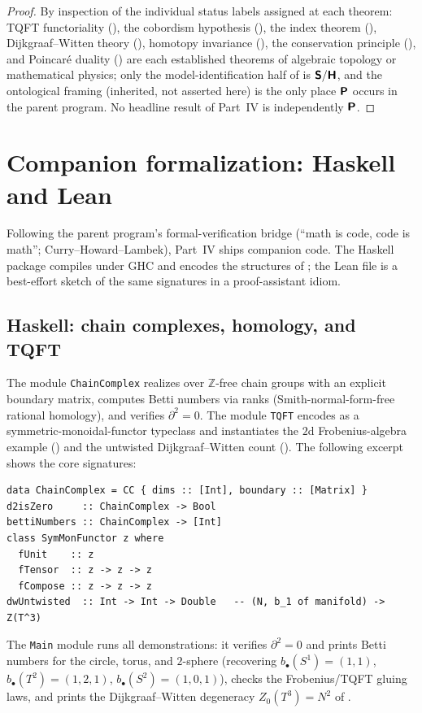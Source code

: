 \documentclass[12pt]{article}
\theoremstyle{definition}
\theoremstyle{remark}
\newcommand{\Zm}{\mathbb{Z}}
\newcommand{\Sfont}{\textnormal{\sffamily\bfseries S}}
\newcommand{\Hfont}{\textnormal{\sffamily\bfseries H}}
\newcommand{\Pfont}{\textnormal{\sffamily\bfseries P}}
\begin{document}
\begin{proof}
By inspection of the individual status labels assigned at each theorem: TQFT
functoriality (), the cobordism hypothesis
(), the index theorem (), Dijkgraaf--Witten
theory (), homotopy invariance (), the
conservation principle (), and Poincar\'e duality
() are each established theorems of algebraic topology or mathematical
physics; only the model-identification half of  is $\Sfont/\Hfont$,
and the ontological framing (inherited, not asserted here) is the only place
$\Pfont$ occurs in the parent program. No headline result of Part~IV is
independently $\Pfont$.
\end{proof}

\section{Companion formalization: Haskell and Lean}
\label{sec:code}

Following the parent program's formal-verification bridge (``math is code, code is
math''; Curry--Howard--Lambek), Part~IV ships companion code. The Haskell package
compiles under GHC and encodes the structures of ;
the Lean file is a best-effort sketch of the same signatures in a proof-assistant
idiom.

\subsection{Haskell: chain complexes, homology, and TQFT}

The module \texttt{ChainComplex} realizes  over
$\Zm$-free chain groups with an explicit boundary matrix, computes Betti numbers
via ranks (Smith-normal-form-free rational homology), and verifies
$\partial^2=0$. The module \texttt{TQFT} encodes  as a
symmetric-monoidal-functor typeclass and instantiates the $2$d Frobenius-algebra
example () and the untwisted Dijkgraaf--Witten count
(). The following excerpt shows the core signatures:
{\small
\begin{verbatim}
data ChainComplex = CC { dims :: [Int], boundary :: [Matrix] }
d2isZero     :: ChainComplex -> Bool
bettiNumbers :: ChainComplex -> [Int]
class SymMonFunctor z where
  fUnit    :: z
  fTensor  :: z -> z -> z
  fCompose :: z -> z -> z
dwUntwisted  :: Int -> Int -> Double   -- (N, b_1 of manifold) -> Z(T^3)
\end{verbatim}
}
The \texttt{Main} module runs all demonstrations: it verifies $\partial^2=0$ and
prints Betti numbers for the circle, torus, and $2$-sphere (recovering
$b_\bullet(S^1)=(1,1)$, $b_\bullet(T^2)=(1,2,1)$, $b_\bullet(S^2)=(1,0,1)$), checks
the Frobenius/TQFT gluing laws, and prints the Dijkgraaf--Witten degeneracy
$Z_0(T^3)=N^2$ of .
\end{document}

